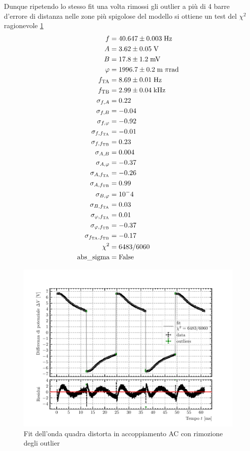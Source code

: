 \documentclass{article}[a4paper, oneside ,11pt]
\begin{document}
Dunque ripetendo lo stesso fit una volta rimossi gli outlier a più di 4 barre d'errore di distanza nelle zone più spigolose del modello si ottiene un test del $\chi^2$ ragionevole \ref{plt:AC_out}
\begin{align*}
f &= 40.647 \pm 0.003 \; \rm Hz \\
A &= 3.62 \pm 0.05 \; \rm V \\
B &= 17.8 \pm 1.2 \; \rm mV \\
\varphi &= 1996.7 \pm 0.2 \; \mathrm{m}\; \pi \si{\radian} \\
f_{\rm TA} &= 8.69 \pm 0.01 \; \rm Hz \\
f_{\rm TB} &= 2.99 \pm 0.04 \; \si{\kilo\hertz} \\
\sigma_{f, A} &= 0.22 \\   
\sigma_{f, B} &= -0.04 \\
\sigma_{f, \varphi} &= -0.92 \\
\sigma_{f, f_{\rm TA}} &= -0.01 \\
\sigma_{f, f_{\rm TB}} &= 0.23 \\
\sigma_{A, B} &= 0.004 \\
\sigma_{A, \varphi} &= -0.37 \\
\sigma_{A, f_{\rm TA}} &= -0.26 \\
\sigma_{A, f_{\rm TB}} &= 0.99 \\
\sigma_{B, \varphi} &= 10^-4 \\
\sigma_{B, f_{\rm TA}} &= 0.03 \\
\sigma_{\varphi, f_{\rm TA}} &= 0.01 \\
\sigma_{\varphi, f_{\rm TB}} &= -0.37 \\
\sigma_{f_{\rm TA}, f_{\rm TB}} &= -0.17 \\
\chi^2 &= 6483/6060 \\
\text{abs\_sigma} &= \rm False
\end{align*}
\begin{figure}[!htb]
	\centering 
 		\includegraphics[scale=0.9]{./AC_out.pdf}
 	\caption{Fit dell'onda quadra distorta in accoppiamento AC con rimozione degli outlier \label{plt:AC_out}}
\end{figure}
\end{document}
